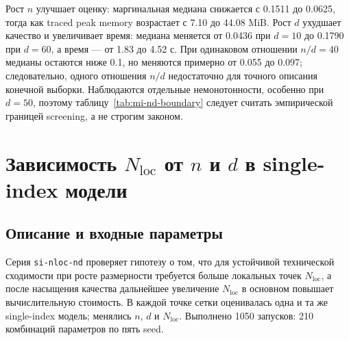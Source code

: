 \documentclass[11pt,a4paper]{article}
\newcommand{\code}[1]{\texttt{#1}}
\begin{document}
Рост $n$ улучшает оценку: маргинальная медиана снижается с 0.1511 до 0.0625,
тогда как traced peak memory возрастает с 7.10 до 44.08 MiB. Рост $d$ ухудшает
качество и увеличивает время: медиана меняется от 0.0436 при $d=10$ до
0.1790 при $d=60$, а время --- от 1.83 до 4.52 с. При одинаковом отношении
$n/d=40$ медианы остаются ниже 0.1, но меняются примерно от 0.055 до 0.097;
следовательно, одного отношения $n/d$ недостаточно для точного описания
конечной выборки. Наблюдаются отдельные немонотонности, особенно при $d=50$,
поэтому таблицу~\ref{tab:mi-nd-boundary} следует считать эмпирической
границей screening, а не строгим законом.


\clearpage
\section{Зависимость \texorpdfstring{$N_{\mathrm{loc}}$}{Nloc} от
\texorpdfstring{$n$ и $d$}{n и d} в single-index модели}

\subsection{Описание и входные параметры}

Серия \code{si-nloc-nd} проверяет гипотезу о том, что для устойчивой
технической сходимости при росте размерности требуется больше локальных
точек $N_{\mathrm{loc}}$, а после насыщения качества дальнейшее увеличение
$N_{\mathrm{loc}}$ в основном повышает вычислительную стоимость. В каждой
точке сетки оценивалась одна и та же single-index модель; менялись $n$, $d$
и $N_{\mathrm{loc}}$. Выполнено 1050 запусков: 210 комбинаций параметров по
пять seed.
\end{document}
